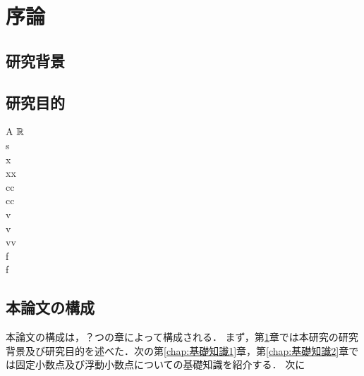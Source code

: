 \chapter{序論}
\label{chap:序論}
\section{研究背景}

\section{研究目的}
A $\mathbb{R}$ \\
s \\
x\\
xx\\
cc \\
cc\\
v\\
v\\
vv\\
f\\
f\\
\section{本論文の構成}
本論文の構成は，？つの章によって構成される．
まず，第\ref{chap:序論}章では本研究の研究背景及び研究目的を述べた．次の第\ref{chap:基礎知識1}章，第\ref{chap:基礎知識2}章では固定小数点及び浮動小数点についての基礎知識を紹介する．
次に

